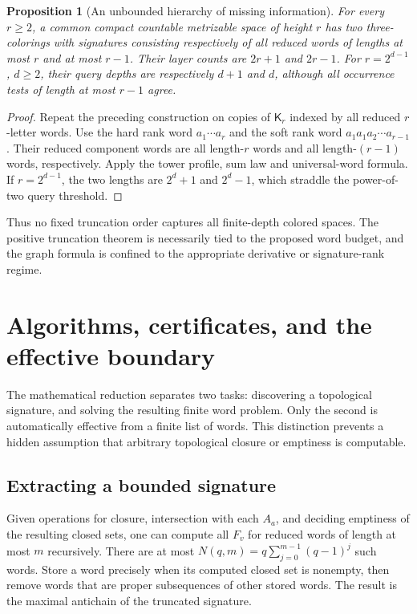 \documentclass[11pt,letterpaper]{article}
\numberwithin{equation}{section}
\newtheorem{proposition}[proposition]{Proposition}
\theoremstyle{definition}
\theoremstyle{remark}
\theoremstyle{definition}
\newcommand{\Tw}{\mathsf K}
\begin{document}
\begin{proposition}[An unbounded hierarchy of missing information]
\label{cw:prop:hierarchy}
For every $r\ge2$, a common compact countable metrizable space of height $r$
has two three-colorings with signatures consisting respectively of all
reduced words of lengths at most $r$ and at most $r-1$.
Their layer counts are $2r+1$ and $2r-1$.
For $r=2^{d-1}$, $d\ge2$, their query depths are respectively $d+1$ and $d$,
although all occurrence tests of length at most $r-1$ agree.
\end{proposition}
\begin{proof}
Repeat the preceding construction on copies of $\Tw_r$ indexed by all reduced
$r$-letter words. Use the hard rank word $a_1\cdots a_r$ and the soft rank
word $a_1a_1a_2\cdots a_{r-1}$. Their reduced component words are all
length-$r$ words and all length-$(r-1)$ words, respectively. Apply the tower
profile, sum law and universal-word formula. If $r=2^{d-1}$, the two lengths
are $2^d+1$ and $2^d-1$, which straddle the power-of-two query threshold.
\end{proof}

Thus no fixed truncation order captures all finite-depth colored spaces.
The positive truncation theorem is necessarily tied to the proposed word
budget, and the graph formula is confined to the appropriate derivative
or signature-rank regime.

\section{Algorithms, certificates, and the effective boundary}
\label{cw:sec:algorithms}

The mathematical reduction separates two tasks: discovering a topological
signature, and solving the resulting finite word problem. Only the second
is automatically effective from a finite list of words. This distinction
prevents a hidden assumption that arbitrary topological closure or emptiness
is computable.

\subsection{Extracting a bounded signature}

Given operations for closure, intersection with each $A_a$, and deciding
emptiness of the resulting closed sets, one can compute all $F_v$ for
reduced words of length at most $m$ recursively. There are at most
$N(q,m)=q\sum_{j=0}^{m-1}(q-1)^j$ such words. Store a word precisely when
its computed closed set is nonempty, then remove words that are proper
subsequences of other stored words. The result is the maximal antichain of
the truncated signature.
\end{document}
